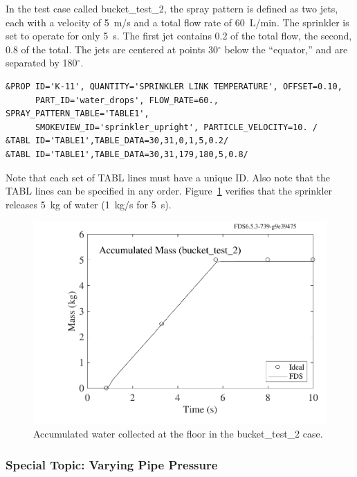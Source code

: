 \documentclass[11pt]{book}
\begin{document}
In the test case called {\ct bucket\_test\_2}, the spray pattern is defined as two jets, each with a velocity of 5~m/s and a total flow rate of 60~L/min. The sprinkler is set to operate for only 5~s. The first jet contains 0.2 of the total flow, the second, 0.8 of the total. The jets are centered at points 30$^\circ$ below the ``equator,'' and are separated by 180$^\circ$.
\begin{lstlisting}
&PROP ID='K-11', QUANTITY='SPRINKLER LINK TEMPERATURE', OFFSET=0.10,
      PART_ID='water_drops', FLOW_RATE=60., SPRAY_PATTERN_TABLE='TABLE1',
      SMOKEVIEW_ID='sprinkler_upright', PARTICLE_VELOCITY=10. /
&TABL ID='TABLE1',TABLE_DATA=30,31,0,1,5,0.2/
&TABL ID='TABLE1',TABLE_DATA=30,31,179,180,5,0.8/
\end{lstlisting}
Note that each set of {\ct TABL} lines must have a unique {\ct ID}.  Also note that the {\ct TABL} lines can be specified in any order. Figure~\ref{bucket_test_2_fig} verifies that the sprinkler releases 5~kg of water (1~kg/s for 5~s).

\begin{figure}[ht]
\centering
\includegraphics[scale=0.55]{SCRIPT_FIGURES/bucket_test_2}
\caption[Results of the {\ct bucket\_test\_2} case]{Accumulated water collected at the floor in the {\ct bucket\_test\_2} case.}
\label{bucket_test_2_fig}
\end{figure}




\subsubsection{Special Topic: Varying Pipe Pressure}
\label{info:pressureramp}
\end{document}
